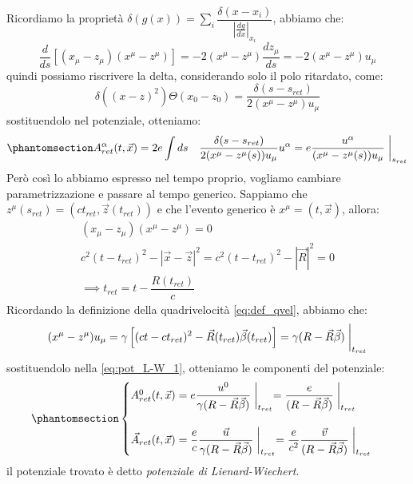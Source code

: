 Ricordiamo la proprietà $\delta(g(x))=\sum_i \dfrac{\delta(x-x_i)}{|\frac{dg}{dx}|_{x_i}}$, abbiamo che:
\begin{equation}
    \dfrac{d}{ds}\left[(x_\mu-z_\mu)(x^\mu-z^\mu)\right]=-2(x^\mu-z^\mu)\dfrac{dz_\mu}{ds}=-2(x^\mu-z^\mu)u_\mu
\end{equation}
quindi possiamo riscrivere la delta, considerando solo il polo ritardato, come:
\begin{equation}
    \delta\left((x-z)^2\right)\Theta(x_0-z_0)=\dfrac{\delta(s-s_{ret})}{2(x^\mu-z^\mu)u_\mu}
\end{equation}
sostituendolo nel potenziale, otteniamo:\begin{equation}\phantomsection\label{eq:pot_L-W_1}
     A_{ret}^\alpha(t,\Vec{x})=2e\int ds\quad \dfrac{\delta(s-s_{ret})}{2(x^\mu-z^\mu(s))u_\mu}u^\alpha=e\dfrac{u^\alpha}{(x^\mu-z^\mu(s))u_\mu}\biggm|_{s_{ret}}\end{equation}
Però così lo abbiamo espresso nel tempo proprio, vogliamo cambiare parametrizzazione e passare al tempo generico. Sappiamo che $z^\mu(s_{ret})=(ct_{ret},\Vec{z}(t_{ret}))$ e che l'evento generico è $x^\mu=(t,\Vec{x})$, allora:
\begin{equation}
    \begin{gathered}
        (x_\mu-z_\mu)(x^\mu-z^\mu)=0\\
        c^2(t-t_{ret})^2-|\Vec{x}-\Vec{z}|^2=c^2(t-t_{ret})^2-|\Vec{R}|^2=0\\
        \implies t_{ret}=t-\dfrac{R(t_{ret})}{c}
    \end{gathered}
\end{equation}
Ricordando la definizione della quadrivelocità \eqref{eq:def_qvel}, abbiamo che:
\begin{equation}
      (x^\mu-z^\mu)u_\mu=\gamma\left[(ct-ct_{ret})^2-\Vec{R}(t_{ret})\Vec{\beta}(t_{ret})\right]=\gamma(R-\Vec{R}\Vec{\beta})\biggm|_{t_{ret}}
\end{equation}
sostituendolo nella \eqref{eq:pot_L-W_1}, otteniamo le componenti del potenziale:
\begin{equation}\phantomsection\label{eq:pot_L-W_2}
\begin{cases}
     A_{ret}^0(t,\Vec{x})=e\dfrac{u^0}{\gamma(R-\Vec{R}\Vec{\beta})}\biggm|_{t_{ret}}=\dfrac{e}{(R-\Vec{R}\Vec{\beta})}\biggm|_{t_{ret}}
     \\
     \\
     \Vec{A}_{ret}(t,\Vec{x})=\dfrac{e}{c}\dfrac{\Vec{u}}{\gamma(R-\Vec{R}\Vec{\beta})}\biggm|_{t_{ret}}=\dfrac{e}{c^2}\dfrac{\Vec{v}}{(R-\Vec{R}\Vec{\beta})}\biggm|_{t_{ret}}
\end{cases}
\end{equation}
il potenziale trovato è detto \textit{potenziale di Lienard-Wiechert}.


